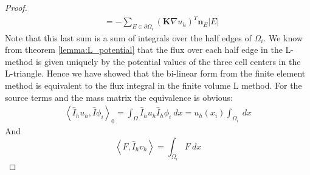 \documentclass[../Main/main.tex]{subfiles}
\begin{document}
\begin{proof}
\begin{equation}
\begin{aligned}
				&=- \sum_{E\in \partial \Omega_i} (\pmb{K}\nabla u_h)^T \pmb{n}_E |E| 
			\end{aligned}
		\end{equation}
		Note that this last sum is a sum of integrals over the half edges of $\Omega_i$. We know from theorem \ref{lemma:L_potential} that the flux over each half edge in the L-method is given uniquely by the potential values of the three cell centers in the L-triangle.
		Hence we have showed that the bi-linear form from the finite element method is equivalent to the flux integral in the finite volume L method. For the source terms and the mass matrix the equivalence is obvious:
		\begin{equation}
			\begin{aligned}
				\left \langle \hat{I}_h  u_h,\hat{I}\phi_i \right \rangle_0 = \int_{\Omega}\hat{I}_h u_h \hat{I}_h \phi_i \ dx = u_h(x_i) \int_{\Omega_i} \ dx
			\end{aligned}
		\end{equation}
		And 
		\begin{equation}
			\left \langle F,\hat{I}_h v_h \right \rangle = \int_{\Omega_i} F \ dx
		\end{equation}
	\end{proof}

	
\end{document}
